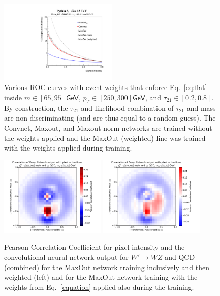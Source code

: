 \begin{figure}[htbp]
  \centering
    \includegraphics[width=0.5\textwidth]{figures/ROCs_window.pdf}
  \caption{Various ROC curves with event weights that enforce Eq.~\ref{eq:flat} inside $m\in[65, 95]\mathsf{GeV}$,  $p_T\in[250, 300]\mathsf{GeV}$, and  $\tau_{21}\in[0.2, 0.8]$.  By construction, the $\tau_{21}$ and likelihood combination of $\tau_{21}$ and mass are non-discriminating (and are thus equal to a random guess).  The Convnet, Maxout, and Maxout-norm networks are trained without the weights applied and the MaxOut (weighted) line was trained with the weights applied during training.}
  \label{fig:rocCube}
\end{figure}


\begin{figure}[htbp]
  \centering
  \includegraphics[width=0.45\textwidth]{figures/hypercube-pixel-activations-corr.pdf} \includegraphics[width=0.45\textwidth]{figures/ahypercube-pixel-activations-corr.pdf}
  \caption{Pearson Correlation Coefficient for pixel intensity and the convolutional neural network output for $W'\rightarrow WZ$ and QCD (combined) for the MaxOut network training inclusively and then weighted (left) and for the MaxOut network training with the weights from Eq.~\ref{equation} applied also during the training.}
  \label{fig:cor_hyper}
\end{figure}


